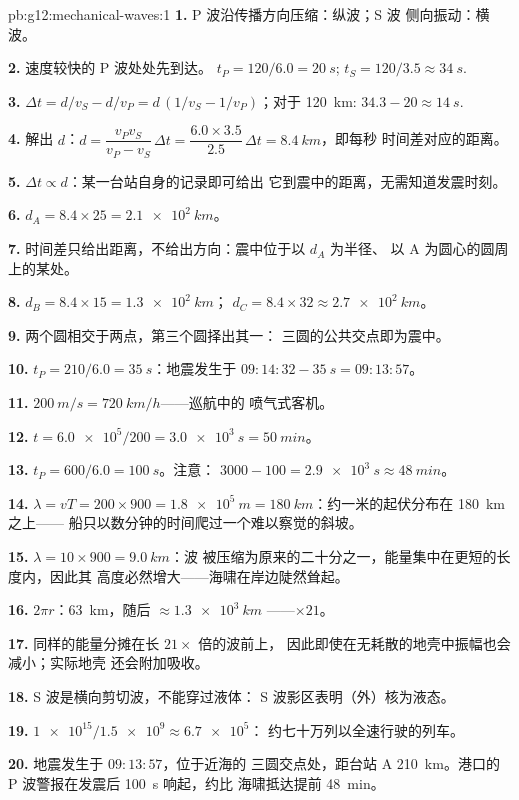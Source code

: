 \begin{solution}{pb:g12:mechanical-waves:1}
\textbf{1.} P 波沿传播方向压缩：纵波；S 波
侧向振动：横波。

\textbf{2.} 速度较快的 P 波处处先到达。
$t_P = 120/6.0 = \qty{20}{s}$; $t_S = 120/3.5 \approx \qty{34}{s}$.

\textbf{3.} $\Delta t = d/v_S - d/v_P = d\,(1/v_S - 1/v_P)$；对于
\qty{120}{km}: $34.3 - 20 \approx \qty{14}{s}$.

\textbf{4.} 解出 $d$：$d = \dfrac{v_P v_S}{v_P - v_S}\,\Delta t
= \dfrac{6.0 \times 3.5}{2.5}\,\Delta t = \qty{8.4}{km}$，即每秒
时间差对应的距离。

\textbf{5.} $\Delta t \propto d$：某一台站自身的记录即可给出
它到震中的距离，无需知道发震时刻。

\textbf{6.} $d_A = 8.4 \times 25 = \qty{2.1e2}{km}$。

\textbf{7.} 时间差只给出距离，不给出方向：震中位于以 $d_A$ 为半径、
以 A 为圆心的圆周上的某处。

\textbf{8.} $d_B = 8.4 \times 15 = \qty{1.3e2}{km}$；
$d_C = 8.4 \times 32 \approx \qty{2.7e2}{km}$。

\textbf{9.} 两个圆相交于两点，第三个圆择出其一：
三圆的公共交点即为震中。

\textbf{10.} $t_P = 210/6.0 = \qty{35}{s}$：地震发生于
$09{:}14{:}32 - \qty{35}{s} = 09{:}13{:}57$。

\textbf{11.} $\qty{200}{m/s} = \qty{720}{km/h}$——巡航中的
喷气式客机。

\textbf{12.} $t = \num{6.0e5}/200 = \qty{3.0e3}{s} = \qty{50}{min}$。

\textbf{13.} $t_P = 600/6.0 = \qty{100}{s}$。注意：
$3000 - 100 = \qty{2.9e3}{s} \approx \qty{48}{min}$。

\textbf{14.} $\lambda = vT = 200 \times 900 = \qty{1.8e5}{m} =
\qty{180}{km}$：约一米的起伏分布在 \qty{180}{km} 之上——
船只以数分钟的时间爬过一个难以察觉的斜坡。

\textbf{15.} $\lambda = 10 \times 900 = \qty{9.0}{km}$：波
被压缩为原来的二十分之一，能量集中在更短的长度内，因此其
高度必然增大——海啸在岸边陡然耸起。

\textbf{16.} $2\pi r$：\qty{63}{km}，随后 $\approx \qty{1.3e3}{km}$
——$\times 21$。

\textbf{17.} 同样的能量分摊在长 $21\times$ 倍的波前上，
因此即使在无耗散的地壳中振幅也会减小；实际地壳
还会附加吸收。

\textbf{18.} S 波是横向剪切波，不能穿过液体：
S 波影区表明（外）核为液态。

\textbf{19.} $\num{1e15}/\num{1.5e9} \approx \num{6.7e5}$：
约七十万列以全速行驶的列车。

\textbf{20.} 地震发生于 $09{:}13{:}57$，位于近海的
三圆交点处，距台站 A \qty{210}{km}。港口的
P 波警报在发震后 \qty{100}{s} 响起，约比
海啸抵达提前 \qty{48}{min}。
\end{solution}
